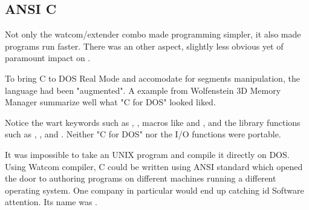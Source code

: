 \subsection{ANSI C}
Not only the watcom/extender combo made programming simpler, it also made programs run faster. There was an other aspect, slightly less obvious yet of paramount impact on \doom.\\
\par
To bring C to DOS Real Mode and accomodate for segments manipulation, the language had been "augmented". A example from Wolfenstein 3D Memory Manager summarize well what "C for DOS" looked liked.\\
\par
{}
\par
Notice the wart keywords such as , , macros like  and , and the  library functions such as , , and . Neither "C for DOS" nor the I/O functions were portable.\\
\par
 It was impossible to take an UNIX program and compile it directly on DOS. Using Watcom compiler, C could be written using ANSI standard which opened the door to authoring programs on different machines running a different operating system. One company in particular would end up catching id Software attention. Its name was \NeXT.